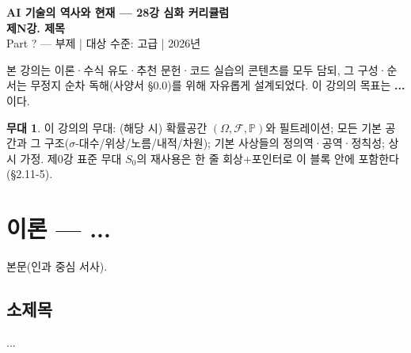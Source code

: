 \documentclass[11pt]{article}
\theoremstyle{plain}
\theoremstyle{definition}
\newtheorem*{stage}{무대}              %
\theoremstyle{remark}
\begin{document}
\begin{center}
  {\sffamily\small\color{accent}\textbf{AI 기술의 역사와 현재 — 28강 심화 커리큘럼}}\\[2pt]
  {\sffamily\Huge\bfseries\color{primary}제N강. 제목}\\[10pt]
  {\large Part ? — 부제 \;|\; 대상 수준: 고급 \;|\; 2026년}
\end{center}
\vspace{0.4em}{\color{rule}\rule{\linewidth}{0.8pt}}\vspace{0.4em}

\begin{keybox}[이 강의를 읽는 법]
본 강의는 이론·수식 유도·추천 문헌·코드 실습의 콘텐츠를 모두 담되, 그 구성·순서는
무정지 순차 독해(사양서 \S0.0)를 위해 자유롭게 설계되었다. 이 강의의 목표는 \textbf{...} 이다.
\end{keybox}

\begin{stage}
이 강의의 무대: (해당 시) 확률공간 $(\Omega,\mathcal F,\mathbb P)$와 필트레이션; 모든 기본 공간과
그 구조($\sigma$-대수/위상/노름/내적/차원); 기본 사상들의 정의역·공역·정칙성; 상시 가정.
제0강 표준 무대 $S_0$의 재사용은 한 줄 회상+포인터로 이 블록 안에 포함한다(\S2.11-5).
\end{stage}

\section{이론 — ...}
본문(인과 중심 서사). %

\subsection{소제목}

\begin{keybox}[메타 교훈]
...
\end{keybox}
\end{document}
